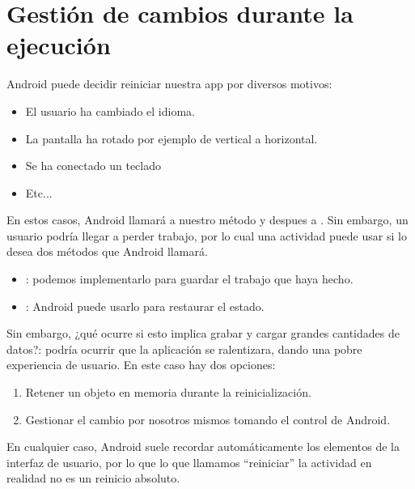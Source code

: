 \documentclass[a4paper,12pt,spanish]{sphinxmanual}
\begin{document}
\section{Gestión de cambios durante la ejecución}
\label{tema1:gestion-de-cambios-durante-la-ejecucion}
Android puede decidir reiniciar nuestra app por diversos motivos:
\begin{itemize}
\item {} 
El usuario ha cambiado el idioma.

\item {} 
La pantalla ha rotado por ejemplo de vertical a horizontal.

\item {} 
Se ha conectado un teclado

\item {} 
Etc...

\end{itemize}

En estos casos, Android llamará a nuestro método  y despues a . Sin embargo, un usuario podría llegar a perder trabajo, por lo cual una actividad puede usar si lo desea dos métodos que Android llamará.
\begin{itemize}
\item {} 
: podemos implementarlo para guardar el trabajo que haya hecho.

\item {} 
: Android puede usarlo para restaurar el estado.

\end{itemize}

Sin embargo, ¿qué ocurre si esto implica grabar y cargar grandes cantidades de datos?: podría ocurrir que la aplicación se ralentizara, dando una pobre experiencia de usuario. En este caso hay dos opciones:
\begin{enumerate}
\item {} 
Retener un objeto en memoria durante la reinicialización.

\item {} 
Gestionar el cambio por nosotros mismos tomando el control de Android.

\end{enumerate}

En cualquier caso, Android suele recordar automáticamente los elementos de la interfaz de usuario, por lo que lo que llamamos ``reiniciar'' la actividad en realidad no es un reinicio absoluto.
\end{document}
